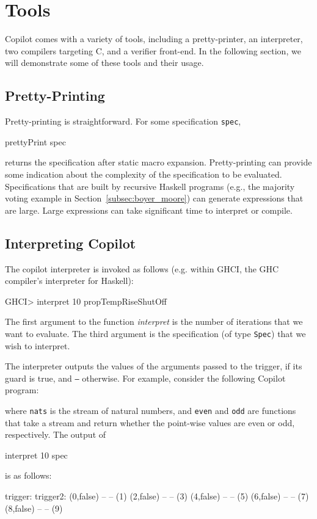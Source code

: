 \documentclass[]{article}
\theoremstyle{example}
\begin{document}
\section{Tools} \label{sec:tools}

Copilot comes with a variety of tools, including a pretty-printer, an interpreter,
two compilers targeting C, and a verifier front-end. In the following section, we will
demonstrate some of these tools and their usage.

\subsection{Pretty-Printing} \label{sec:pretty-printing}
Pretty-printing is straightforward.  For some specification {\tt spec},
%
\begin{code}
prettyPrint spec
\end{code}
%
\noindent
returns the specification after static macro expansion.  Pretty-printing can
provide some indication about the complexity of the specification to be
evaluated.  Specifications that are built by recursive Haskell programs (e.g.,
the majority voting example in Section~\ref{subsec:boyer_moore}) can generate
expressions that are large.  Large expressions can take significant
time to interpret or compile.

\subsection{Interpreting Copilot}

The copilot interpreter is invoked as follows (e.g. within GHCI, the GHC compiler's
interpreter for Haskell):
%
\begin{code}
GHCI> interpret 10 propTempRiseShutOff
\end{code}
%
The first argument to the function \emph{interpret} is the number of iterations that we want to evaluate.
The third argument is the specification (of type {\tt Spec}) that we wish to interpret.

The interpreter outputs the values of the arguments passed to the trigger, if
its guard is true, and {\tt --} otherwise.  For example, consider the following
Copilot program:
%
where {\tt nats} is the stream of natural numbers, and {\tt even} and {\tt odd}
are functions that take a stream and return whether the point-wise values are
even or odd, respectively.  The output of 
%
\begin{code}
interpret 10 spec
\end{code}
%
is as follows:
%
\begin{code}
trigger:   trigger2: 
(0,false)  --        
--         (1)       
(2,false)  --        
--         (3)       
(4,false)  --        
--         (5)       
(6,false)  --        
--         (7)       
(8,false)  --        
--         (9)     
\end{code}
%
\end{document}
